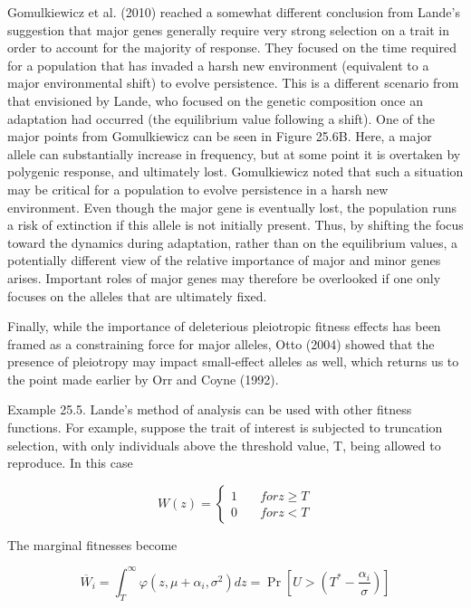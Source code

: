 \documentclass{article}
\begin{document}
Gomulkiewicz et al. (2010) reached a somewhat different conclusion from Lande's suggestion that major genes generally require very strong selection on a trait in order to account for the majority of response. They focused on the time required for a population that has invaded a harsh new environment (equivalent to a major environmental shift) to evolve persistence. This is a different scenario from that envisioned by Lande, who focused on the genetic composition once an adaptation had occurred (the equilibrium value following a shift). One of the major points from Gomulkiewicz can be seen in Figure 25.6B. Here, a major allele can substantially increase in frequency, but at some point it is overtaken by polygenic response, and ultimately lost. Gomulkiewicz noted that such a situation may be critical for a population to evolve persistence in a harsh new environment. Even though the major gene is eventually lost, the population runs a risk of extinction if this allele is not initially present. Thus, by shifting the focus toward the dynamics during adaptation, rather than on the equilibrium values, a potentially different view of the relative importance of major and minor genes arises. Important roles of major genes may therefore be overlooked if one only focuses on the alleles that are ultimately fixed.

Finally, while the importance of deleterious pleiotropic fitness effects has been framed as a constraining force for major alleles, Otto (2004) showed that the presence of pleiotropy may impact small-effect alleles as well, which returns us to the point made earlier by Orr and Coyne (1992).

Example 25.5. Lande's method of analysis can be used with other fitness functions. For example, suppose the trait of interest is subjected to truncation selection, with only individuals above the threshold value, T, being allowed to reproduce. In this case

\begin{equation}
W(z)=\left\{\begin{aligned}1&\quad for z\geq T\\ 0&\quad for z<T\end{aligned}\right.
\end{equation}

The marginal fitnesses become

\begin{equation}
\overline{W}_{i}=\int_{T}^{\infty}\varphi(z,\mu+\alpha_{i},\sigma^{2})d z=\Pr\left[U>\left(T^{*}-\frac{\alpha_{i}}{\sigma}\right)\right]
\end{equation}
\end{document}
